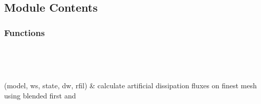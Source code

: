 \documentclass[letterpaper,10pt,english]{sphinxmanual}
\begin{document}
\section{}
\label{\detokenize{autoapi/dflux/index:module-dflux}}\label{\detokenize{autoapi/dflux/index:dflux}}\label{\detokenize{autoapi/dflux/index::doc}}

\subsection{Module Contents}
\label{\detokenize{autoapi/dflux/index:module-contents}}

\subsubsection{Functions}
\label{\detokenize{autoapi/dflux/index:functions}}

\begin{savenotes}\sphinxatlongtablestart\begin{longtable}[c]{}
\hline

\endfirsthead

%
{}\\
\hline

\endhead

\hline
{}\\
\endfoot

\endlastfoot

\sphinxAtStartPar
{\hyperref[\detokenize{autoapi/dflux/index:dflux.dflux}]{}}(model, ws, state, dw, rfil)
&
\sphinxAtStartPar
calculate artificial dissipation fluxes on finest mesh using blended first and
\\
\hline
\end{longtable}\sphinxatlongtableend\end{savenotes}
\end{document}
